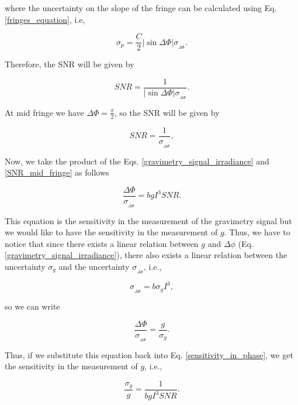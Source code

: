\documentclass{article}
\begin{document}
where the uncertainty on the slope of the fringe can be calculated using Eq. \ref{fringes_equation}, i.e,

\begin{equation}
    \sigma_{p} = \frac{C}{2} |\sin{\Delta \Phi}| \sigma_{_{\Delta \Phi}}.
\end{equation}

Therefore, the SNR will be given by

\begin{equation}
    SNR = \frac{1}{|\sin{\Delta \Phi}|  \sigma_{_{\Delta \Phi}}}.
\end{equation}

At mid fringe we have $\Delta \Phi = \frac{\pi}{2}$, so the SNR will be given by

\begin{equation}\label{SNR_mid_fringe}
    SNR = \frac{1}{\sigma_{_{\Delta \Phi}}},
\end{equation}

Now, we take the product of the Eqs. \ref{gravimetry_signal_irradiance} and \ref{SNR_mid_fringe} as follows

\begin{equation}\label{sensitivity_in_phase}
    \frac{\Delta \Phi}{\sigma_{_{\Delta \Phi}}} = b g I^3 SNR.
\end{equation}

This equation is the sensitivity in the measurement of the gravimetry signal but we would like to have the sensitivity in the measurement of $g$. Thus,
we have to notice that since there exists a linear relation between $g$ and $\Delta \phi$ (Eq. \ref{gravimetry_signal_irradiance}), there also exists a linear relation between the uncertainty $\sigma_{g}$ and the uncertainty $\sigma_{_{\Delta \Phi}}$, i.e.,

\begin{equation}
    \sigma_{_{\Delta \Phi}} = b \sigma_{g} I^3,
\end{equation}

so we can write 

\begin{equation}
    \frac{\Delta \Phi}{\sigma_{_{\Delta \Phi}}} = \frac{g}{\sigma_{g}}.
\end{equation}

Thus, if we substitute this equation back into Eq. \ref{sensitivity_in_phase}, we get the sensitivity in the measurement of $g$, i.e.,

\begin{equation}\label{sensitivity_eq}
    \frac{\sigma_{g}}{g} = \frac{1}{b g I^3 SNR}.
\end{equation}
\end{document}

